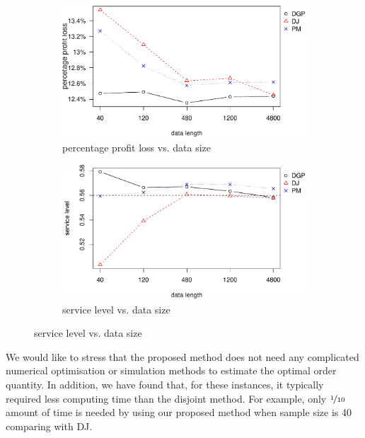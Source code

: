 \documentclass{article}
\begin{document}
\begin{figure}
\centering
\caption{Performance vs. data size with nonlinear profit function}
\begin{subfigure}[b]{0.48\textwidth}
\centering
\includegraphics[width=\textwidth]{nonlinear-plot_files/figure-latex/ppl-1.pdf}
\caption{percentage profit loss vs. data size}
\end{subfigure}
\hfill
\begin{subfigure}[b]{0.48\textwidth}
\centering
\includegraphics[width=\textwidth]{nonlinear-plot_files/figure-latex/sl-1.pdf}
\caption{service level vs. data size}
\end{subfigure}
\label{fig:non}
\end{figure}

We would like to stress that the proposed method does not need any complicated numerical optimisation or simulation methods to estimate the optimal order quantity. In addition, we have found that, for these instances, it typically required less computing time than the disjoint method. For example, only $\nicefrac{1}{10}$ amount of time is needed by using our proposed method when sample size is 40 comparing with DJ.
 
\end{document}
